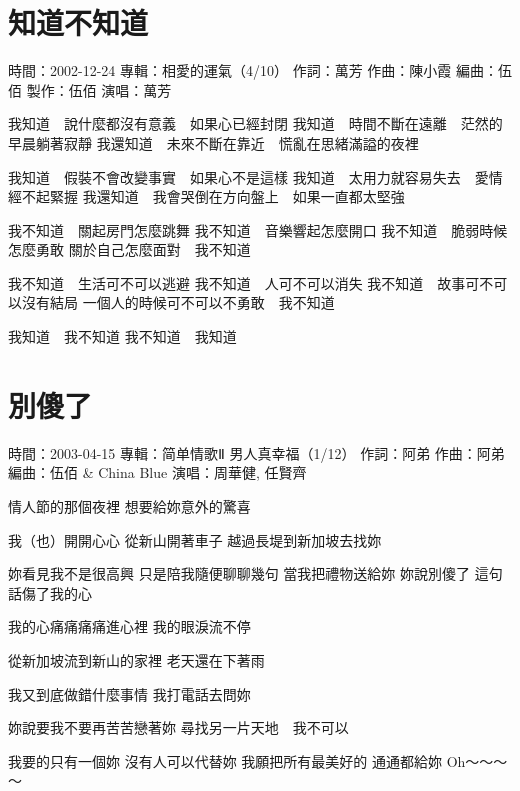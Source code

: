 \documentclass[UTF8,a4paper,oneside,twocolumn,12pt]{ctexbook}
\newcommand{\infopair}[2]{\textbullet #1：#2}
\newcommand{\zc}[1][伍佰]{\infopair{作詞}{#1}}
\newcommand{\zq}[1][伍佰]{\infopair{作曲}{#1}}
\newcommand{\bq}[1][伍佰]{\infopair{編曲}{#1}}
\newcommand{\zj}[1]{\infopair{專輯}{#1}}
\newcommand{\zz}[1]{\infopair{製作}{#1}}
\newcommand{\sj}[1]{\infopair{時間}{#1}}
\newenvironment{info}{\begin{flushleft}\kaishu
	}
	{\end{flushleft}\normalsize\yahei\par}
\newenvironment{lyric}{
	}
{}
\begin{document}
\section{知道不知道}
\begin{info}
	\sj{2002-12-24}
	\zj{相愛的運氣（4/10）}
	\zc[萬芳]
	\zq[陳小霞]
	\bq[伍佰]
	\zz{伍佰}
	\infopair{演唱}{萬芳}
\end{info}
\begin{lyric}
	我知道　說什麼都沒有意義　如果心已經封閉
	我知道　時間不斷在遠離　茫然的早晨躺著寂靜
	我還知道　未來不斷在靠近　慌亂在思緒滿謚的夜裡

	我知道　假裝不會改變事實　如果心不是這樣
	我知道　太用力就容易失去　愛情經不起緊握
	我還知道　我會哭倒在方向盤上　如果一直都太堅強

	我不知道　關起房門怎麼跳舞
	我不知道　音樂響起怎麼開口
	我不知道　脆弱時候怎麼勇敢
	關於自己怎麼面對　我不知道

	我不知道　生活可不可以逃避
	我不知道　人可不可以消失
	我不知道　故事可不可以沒有結局
	一個人的時候可不可以不勇敢　我不知道

	我知道　我不知道
	我不知道　我知道
\end{lyric}

\section{別傻了}
\begin{info}
	\sj{2003-04-15}
	\zj{简单情歌Ⅱ 男人真幸福（1/12）}
	\zc[阿弟]
	\zq[阿弟]
	\bq[伍佰 \& China Blue]
	\infopair{演唱}{周華健, 任賢齊}
\end{info}
\begin{lyric}
	情人節的那個夜裡
	想要給妳意外的驚喜

	我（也）開開心心 從新山開著車子
	越過長堤到新加坡去找妳

	妳看見我不是很高興
	只是陪我隨便聊聊幾句
	當我把禮物送給妳
	妳說別傻了
	這句話傷了我的心

	我的心痛痛痛痛進心裡
	我的眼淚流不停

	從新加坡流到新山的家裡
	老天還在下著雨

	我又到底做錯什麼事情
	我打電話去問妳

	妳說要我不要再苦苦戀著妳
	尋找另一片天地　我不可以

	我要的只有一個妳 沒有人可以代替妳
	我願把所有最美好的 通通都給妳
	Oh～～～～
\end{lyric}
\end{document}
